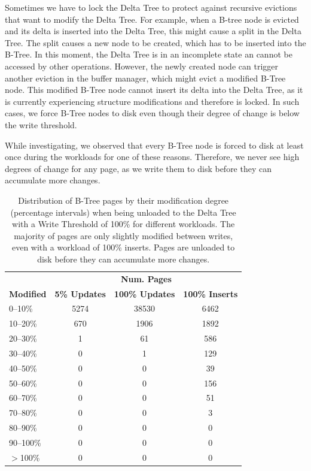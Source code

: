 \begin{enumerate}
Sometimes we have to lock the Delta Tree to protect against recursive evictions that want to modify the Delta Tree.
For example, when a B-tree node is evicted and its delta is inserted into the Delta Tree, this might cause a split in the Delta Tree.
The split causes a new node to be created, which has to be inserted into the B-Tree.
In this moment, the Delta Tree is in an incomplete state an cannot be accessed by other operations.
However, the newly created node can trigger another eviction in the buffer manager, which might evict a modified B-Tree node.
This modified B-Tree node cannot insert its delta into the Delta Tree, as it is currently experiencing structure modifications and therefore is locked.
In such cases, we force B-Tree nodes to disk even though their degree of change is below the write threshold.

While investigating, we observed that every B-Tree node is forced to disk at least once during the workloads for one of these reasons.
Therefore, we never see high degrees of change for any page, as we write them to disk before they can accumulate more changes.

\end{enumerate}

\begin{table}[ht]
  \centering
    \begin{tabular}{l|ccc}
    \toprule
    & \multicolumn{3}{c}{\textbf{Num. Pages}} \\
    \cmidrule(lr){2-4}
    \textbf{Modified} & \textbf{5\% Updates} & \textbf{100\% Updates} & \textbf{100\% Inserts} \\
    \midrule
    0--10\%   & 5274 &  38530 &  6462 \\
    10--20\%  & 670 & 1906 &  1892 \\
    20--30\%  & 1 & 61 & 586 \\
    30--40\%  & 0 & 1 & 129\\
    40--50\%  & 0 & 0 & 39 \\
    50--60\%  & 0 & 0 & 156 \\
    60--70\%  & 0 & 0 & 51 \\
    70--80\%  & 0 & 0 & 3 \\
    80--90\%  & 0 & 0 & 0 \\
    90--100\% & 0 & 0 & 0 \\
    $>$100\% & 0 & 0 & 0 \\
    \bottomrule
  \end{tabular}
  \caption{Distribution of B-Tree pages by their modification degree (percentage intervals) when being unloaded to the Delta Tree with a Write Threshold of 100\% for different workloads. The majority of pages are only slightly modified between writes, even with a workload of 100\% inserts. Pages are unloaded to disk before they can accumulate more changes.}
  \label{tab:modification-degree}
\end{table}

